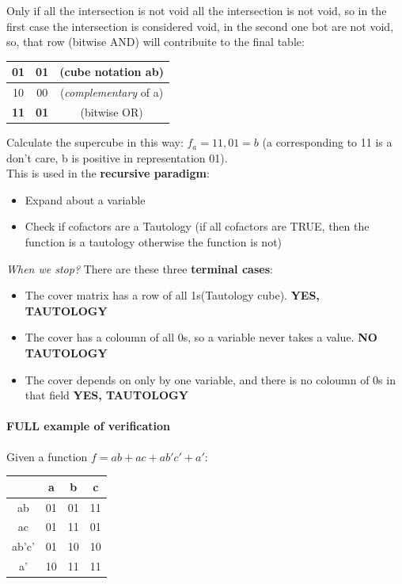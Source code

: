 	Only if all the intersection is not void all the intersection is not void, so in the first case the intersection is considered void, in the second one bot are not void, so, that row (bitwise AND) will contribuite to the final table:\\ 
	
\begin{center}
		\begin{tabular}{c | c | c}
		01 & 01 & (cube notation ab) \\ \hline
		10 & 00 & (\textit{complementary} of a)\\ \hline 
		\textbf{11} & \textbf{01} & (bitwise OR) \\
	\end{tabular}
\end{center}
	
Calculate the supercube in this way: $f_{a} = 11,01 = b$ (a corresponding to 11 is a don't care, b is positive in representation 01).\\

This is used in the \textbf{recursive paradigm}:

\begin{itemize}
	\item Expand about a variable
	\item Check if cofactors are a Tautology (if all cofactors are TRUE, then the function is a tautology otherwise the function is not)
\end{itemize}

\textit{When we stop?} There are these three \textbf{terminal cases}:
\\
\begin{itemize}
	\item The cover matrix has a row of all 1s(Tautology cube). \textbf{YES, TAUTOLOGY}
	\item The cover has a coloumn of all 0s, so a variable never takes a value. \textbf{NO TAUTOLOGY}
	\item The cover depends on only by one variable, and there is no coloumn of 0s in that field \textbf{YES, TAUTOLOGY}
\end{itemize}

\paragraph{FULL example of verification} Given a function $f= ab+ac+ab'c'+a'$:

\begin{center}
	\begin{tabular}{c || c | c | c}
	{} & a & b & c \\ \hline \hline
	ab & 01 & 01 & 11\\ \hline
	ac & 01 & 11 & 01\\ \hline 
	ab'c' & 01 & 10 & 10 \\ \hline
	a' & 10 & 11 & 11
	\end{tabular}
\end{center}

